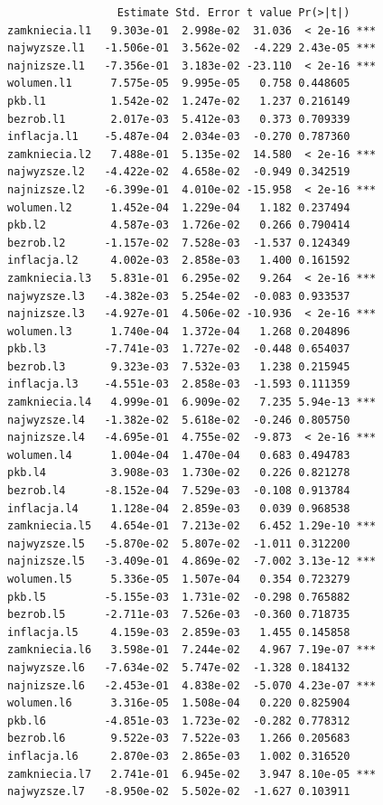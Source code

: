 \documentclass[
  polish,
  letterpaper,
  DIV=11,
  numbers=noendperiod]{scrartcl}
\begin{document}
\begin{verbatim}
                 Estimate Std. Error t value Pr(>|t|)    
zamkniecia.l1   9.303e-01  2.998e-02  31.036  < 2e-16 ***
najwyzsze.l1   -1.506e-01  3.562e-02  -4.229 2.43e-05 ***
najnizsze.l1   -7.356e-01  3.183e-02 -23.110  < 2e-16 ***
wolumen.l1      7.575e-05  9.995e-05   0.758 0.448605    
pkb.l1          1.542e-02  1.247e-02   1.237 0.216149    
bezrob.l1       2.017e-03  5.412e-03   0.373 0.709339    
inflacja.l1    -5.487e-04  2.034e-03  -0.270 0.787360    
zamkniecia.l2   7.488e-01  5.135e-02  14.580  < 2e-16 ***
najwyzsze.l2   -4.422e-02  4.658e-02  -0.949 0.342519    
najnizsze.l2   -6.399e-01  4.010e-02 -15.958  < 2e-16 ***
wolumen.l2      1.452e-04  1.229e-04   1.182 0.237494    
pkb.l2          4.587e-03  1.726e-02   0.266 0.790414    
bezrob.l2      -1.157e-02  7.528e-03  -1.537 0.124349    
inflacja.l2     4.002e-03  2.858e-03   1.400 0.161592    
zamkniecia.l3   5.831e-01  6.295e-02   9.264  < 2e-16 ***
najwyzsze.l3   -4.382e-03  5.254e-02  -0.083 0.933537    
najnizsze.l3   -4.927e-01  4.506e-02 -10.936  < 2e-16 ***
wolumen.l3      1.740e-04  1.372e-04   1.268 0.204896    
pkb.l3         -7.741e-03  1.727e-02  -0.448 0.654037    
bezrob.l3       9.323e-03  7.532e-03   1.238 0.215945    
inflacja.l3    -4.551e-03  2.858e-03  -1.593 0.111359    
zamkniecia.l4   4.999e-01  6.909e-02   7.235 5.94e-13 ***
najwyzsze.l4   -1.382e-02  5.618e-02  -0.246 0.805750    
najnizsze.l4   -4.695e-01  4.755e-02  -9.873  < 2e-16 ***
wolumen.l4      1.004e-04  1.470e-04   0.683 0.494783    
pkb.l4          3.908e-03  1.730e-02   0.226 0.821278    
bezrob.l4      -8.152e-04  7.529e-03  -0.108 0.913784    
inflacja.l4     1.128e-04  2.859e-03   0.039 0.968538    
zamkniecia.l5   4.654e-01  7.213e-02   6.452 1.29e-10 ***
najwyzsze.l5   -5.870e-02  5.807e-02  -1.011 0.312200    
najnizsze.l5   -3.409e-01  4.869e-02  -7.002 3.13e-12 ***
wolumen.l5      5.336e-05  1.507e-04   0.354 0.723279    
pkb.l5         -5.155e-03  1.731e-02  -0.298 0.765882    
bezrob.l5      -2.711e-03  7.526e-03  -0.360 0.718735    
inflacja.l5     4.159e-03  2.859e-03   1.455 0.145858    
zamkniecia.l6   3.598e-01  7.244e-02   4.967 7.19e-07 ***
najwyzsze.l6   -7.634e-02  5.747e-02  -1.328 0.184132    
najnizsze.l6   -2.453e-01  4.838e-02  -5.070 4.23e-07 ***
wolumen.l6      3.316e-05  1.508e-04   0.220 0.825904    
pkb.l6         -4.851e-03  1.723e-02  -0.282 0.778312    
bezrob.l6       9.522e-03  7.522e-03   1.266 0.205683    
inflacja.l6     2.870e-03  2.865e-03   1.002 0.316520    
zamkniecia.l7   2.741e-01  6.945e-02   3.947 8.10e-05 ***
najwyzsze.l7   -8.950e-02  5.502e-02  -1.627 0.103911    

\end{verbatim}
\end{document}

